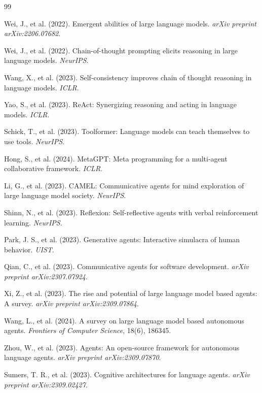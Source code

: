 \documentclass[11pt,a4paper]{article}
\theoremstyle{definition}
\begin{document}

\begin{thebibliography}{99}

Wei, J., et al. (2022). Emergent abilities of large language models. \textit{arXiv preprint arXiv:2206.07682}.

Wei, J., et al. (2022). Chain-of-thought prompting elicits reasoning in large language models. \textit{NeurIPS}.

Wang, X., et al. (2023). Self-consistency improves chain of thought reasoning in language models. \textit{ICLR}.

Yao, S., et al. (2023). ReAct: Synergizing reasoning and acting in language models. \textit{ICLR}.

Schick, T., et al. (2023). Toolformer: Language models can teach themselves to use tools. \textit{NeurIPS}.

Hong, S., et al. (2024). MetaGPT: Meta programming for a multi-agent collaborative framework. \textit{ICLR}.

Li, G., et al. (2023). CAMEL: Communicative agents for mind exploration of large language model society. \textit{NeurIPS}.

Shinn, N., et al. (2023). Reflexion: Self-reflective agents with verbal reinforcement learning. \textit{NeurIPS}.

Park, J. S., et al. (2023). Generative agents: Interactive simulacra of human behavior. \textit{UIST}.

Qian, C., et al. (2023). Communicative agents for software development. \textit{arXiv preprint arXiv:2307.07924}.

Xi, Z., et al. (2023). The rise and potential of large language model based agents: A survey. \textit{arXiv preprint arXiv:2309.07864}.

Wang, L., et al. (2024). A survey on large language model based autonomous agents. \textit{Frontiers of Computer Science}, 18(6), 186345.

Zhou, W., et al. (2023). Agents: An open-source framework for autonomous language agents. \textit{arXiv preprint arXiv:2309.07870}.

Sumers, T. R., et al. (2023). Cognitive architectures for language agents. \textit{arXiv preprint arXiv:2309.02427}.


\end{thebibliography}
\end{document}
